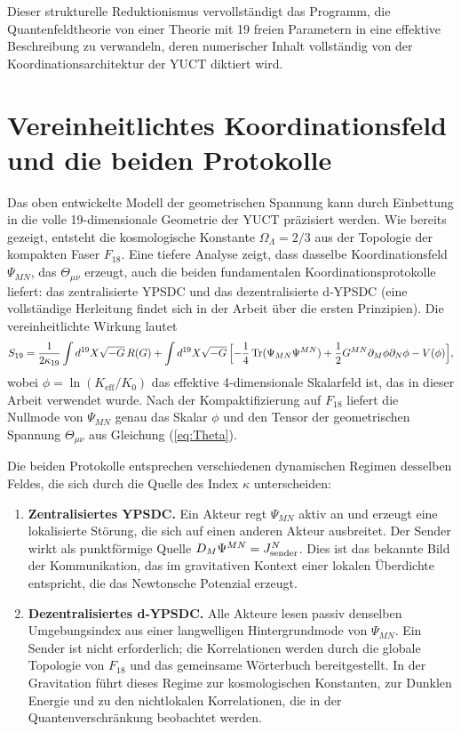 \documentclass[12pt,a4paper]{article}
\DeclareMathOperator{\Tr}{Tr}
\begin{document}
	Dieser strukturelle Reduktionismus vervollständigt das Programm, die Quantenfeldtheorie von einer Theorie mit 19 freien Parametern in eine effektive Beschreibung zu verwandeln, deren numerischer Inhalt vollständig von der Koordinationsarchitektur der YUCT diktiert wird.
	
	\section{Vereinheitlichtes Koordinationsfeld und die beiden Protokolle}
	\label{sec:unified-protocols}
	
	Das oben entwickelte Modell der geometrischen Spannung kann durch Einbettung in die volle 19-dimensionale Geometrie der YUCT präzisiert werden. Wie bereits gezeigt, entsteht die kosmologische Konstante \(\Omega_\Lambda=2/3\) aus der Topologie der kompakten Faser \(F_{18}\). Eine tiefere Analyse zeigt, dass dasselbe Koordinationsfeld \(\Psi_{MN}\), das \(\Theta_{\mu\nu}\) erzeugt, auch die beiden fundamentalen Koordinationsprotokolle liefert: das zentralisierte YPSDC und das dezentralisierte d‑YPSDC (eine vollständige Herleitung findet sich in der Arbeit über die ersten Prinzipien). Die vereinheitlichte Wirkung lautet
	\begin{equation}
		S_{19} = \frac{1}{2\kappa_{19}} \int d^{19}X \sqrt{-G}\, R(G)
		+ \int d^{19}X \sqrt{-G}\,
		\Bigl[ -\frac14 \Tr(\Psi_{MN}\Psi^{MN})
		+ \frac12 G^{MN}\partial_M\phi \partial_N\phi
		- V(\phi) \Bigr],
		\label{eq:unified-gravity}
	\end{equation}
	wobei \(\phi = \ln(K_{\mathrm{eff}}/K_0)\) das effektive 4‑dimensionale Skalarfeld ist, das in dieser Arbeit verwendet wurde. Nach der Kompaktifizierung auf \(F_{18}\) liefert die Nullmode von \(\Psi_{MN}\) genau das Skalar \(\phi\) und den Tensor der geometrischen Spannung \(\Theta_{\mu\nu}\) aus Gleichung (\ref{eq:Theta}).
	
	Die beiden Protokolle entsprechen verschiedenen dynamischen Regimen desselben Feldes, die sich durch die Quelle des Index \(\kappa\) unterscheiden:
	\begin{enumerate}[leftmargin=*]
		\item \textbf{Zentralisiertes YPSDC.} Ein Akteur regt \(\Psi_{MN}\) aktiv an und erzeugt eine lokalisierte Störung, die sich auf einen anderen Akteur ausbreitet. Der Sender wirkt als punktförmige Quelle \(D_M\Psi^{MN} = J^N_{\rm sender}\). Dies ist das bekannte Bild der Kommunikation, das im gravitativen Kontext einer lokalen Überdichte entspricht, die das Newtonsche Potenzial erzeugt.
		\item \textbf{Dezentralisiertes d‑YPSDC.} Alle Akteure lesen passiv denselben Umgebungsindex aus einer langwelligen Hintergrundmode von \(\Psi_{MN}\). Ein Sender ist nicht erforderlich; die Korrelationen werden durch die globale Topologie von \(F_{18}\) und das gemeinsame Wörterbuch bereitgestellt. In der Gravitation führt dieses Regime zur kosmologischen Konstanten, zur Dunklen Energie und zu den nichtlokalen Korrelationen, die in der Quantenverschränkung beobachtet werden.
	\end{enumerate}
	
\end{document}
